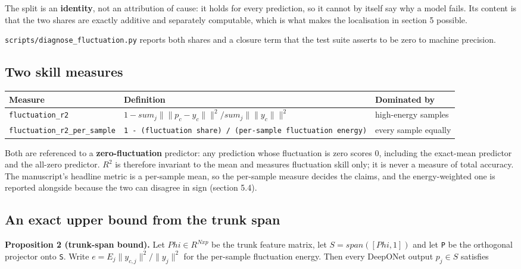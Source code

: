 \documentclass[preprint,12pt]{elsarticle}
\begin{document}
The split is an \textbf{identity}, not an attribution of cause: it holds for every prediction, so it cannot by itself say why a model fails. Its content is that the two shares are exactly additive and separately computable, which is what makes the localisation in section 5 possible.

\texttt{scripts/diagnose\_fluctuation.py} reports both shares and a closure term that the test suite asserts to be zero to machine precision.

\subsection{Two skill measures}

\begin{center}
\begin{adjustbox}{max width=\linewidth}
\small
\begin{tabular}{lll}
\toprule
Measure & Definition & Dominated by \\
\midrule
\texttt{fluctuation\_r2} & $1 - sum_j \|\|p_c-y_c\|\|^2 / sum_j \|\|y_c\|\|^2$ & high-energy samples \\
\texttt{fluctuation\_r2\_per\_sample} & \texttt{1 - (fluctuation share) / (per-sample fluctuation energy)} & every sample equally \\
\bottomrule
\end{tabular}
\end{adjustbox}
\end{center}


Both are referenced to a \textbf{zero-fluctuation} predictor: any prediction whose fluctuation is zero scores 0, including the exact-mean predictor and the all-zero predictor. $R^2$ is therefore invariant to the mean and measures fluctuation skill only; it is never a measure of total accuracy. The manuscript's headline metric is a per-sample mean, so the per-sample measure decides the claims, and the energy-weighted one is reported alongside because the two can disagree in sign (section 5.4).

\subsection{An exact upper bound from the trunk span}

\textbf{Proposition 2 (trunk-span bound).} Let $Phi \in R^{N x p}$ be the trunk feature matrix, let $S = span([Phi, 1])$ and let \texttt{P} be the orthogonal projector onto \texttt{S}. Write $e = E_j \|y_{c,j}\|^2 / \|y_j\|^2$ for the per-sample fluctuation energy. Then every DeepONet output $p_j \in S$ satisfies
\end{document}
